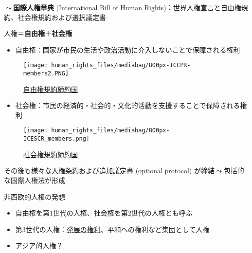 \documentclass[
  xelatex,
  ja=standard]{bxjsarticle}
\providecommand{\tightlist}{%
  \setlength{\itemsep}{0pt}\setlength{\parskip}{0pt}}\usepackage{longtable,booktabs,array}
\begin{document}
\(\leadsto\)\href{https://www.unic.or.jp/activities/humanrights/document/bill_of_rights/}{\textbf{国際人権章典}}
(International Bill of Human
Rights)：世界人権宣言と自由権規約、社会権規約および選択議定書

人権＝\textbf{自由権}＋\textbf{社会権}

\begin{itemize}
\tightlist
\item
  自由権：国家が市民の生活や政治活動に介入しないことで保障される権利
\end{itemize}

\begin{figure}[htpb]

{\centering \texttt{[image: human\_rights\_files/mediabag/800px-ICCPR-members2.PNG]}

}

\caption{\href{https://commons.wikimedia.org/wiki/File:ICCPR-members2.PNG}{自由権規約締約国}}

\end{figure}

\begin{itemize}
\tightlist
\item
  社会権：市民の経済的・社会的・文化的活動を支援することで保障される権利
\end{itemize}

\begin{figure}[htpb]

{\centering \texttt{[image: human\_rights\_files/mediabag/800px-ICESCR\_members.png]}

}

\caption{\href{https://commons.wikimedia.org/wiki/File:ICESCR_members.svg}{社会権規約締約国}}

\end{figure}

その後も\href{https://www.ohchr.org/en/core-international-human-rights-instruments-and-their-monitoring-bodies}{様々な人権条約}および追加議定書
(optional protocol) が締結\(\leadsto\)包括的な国際人権法が形成

非西欧的人権の発想

\begin{itemize}
\tightlist
\item
  自由権を第1世代の人権、社会権を第2世代の人権とも呼ぶ
\item
  第3世代の人権：\href{https://www.unic.or.jp/activities/humanrights/promotion_protection/development/}{発展の権利}、平和への権利など集団として人権
\item
  アジア的人権？
\end{itemize}
\end{document}
